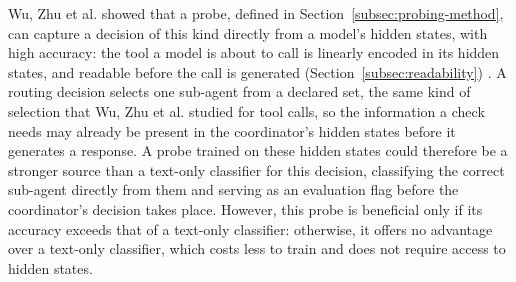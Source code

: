 Wu, Zhu et al. showed that a probe, defined in Section~\ref{subsec:probing-method}, can capture a decision of this kind directly from a model's hidden states, with high accuracy: the tool a model is about to call is linearly encoded in its hidden states, and readable before the call is generated (Section~\ref{subsec:readability}) \cite{wuToolCallingLinearly2026}. A routing decision selects one sub-agent from a declared set, the same kind of selection that Wu, Zhu et al. studied for tool calls, so the information a check needs may already be present in the coordinator's hidden states before it generates a response. A probe trained on these hidden states could therefore be a stronger source than a text-only classifier for this decision, classifying the correct sub-agent directly from them and serving as an evaluation flag before the coordinator's decision takes place. However, this probe is beneficial only if its accuracy exceeds that of a text-only classifier: otherwise, it offers no advantage over a text-only classifier, which costs less to train and does not require access to hidden states.
